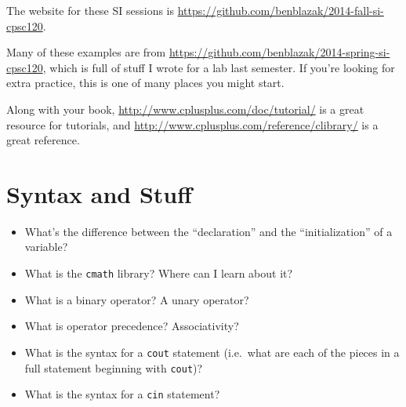 \documentclass[12pt,letterpaper]{article}
\begin{document}
\thispagestyle{firstpage}

The website for these SI sessions is
\url{https://github.com/benblazak/2014-fall-si-cpsc120}.

Many of these examples are from
\url{https://github.com/benblazak/2014-spring-si-cpsc120}, which is full of
stuff I wrote for a lab last semester.  If you're looking for extra practice,
this is one of many places you might start.

Along with your book, \url{http://www.cplusplus.com/doc/tutorial/} is a great
resource for tutorials, and \url{http://www.cplusplus.com/reference/clibrary/}
is a great reference.


\filbreak
\section*{Syntax and Stuff}
\begin{itemize}[itemsep=10ex]

  \item What's the difference between the ``declaration'' and the
    ``initialization'' of a variable?

  \item What is the \texttt{cmath} library?  Where can I learn about
    it?

  \item What is a binary operator?  A unary operator?

  \item What is operator precedence?  Associativity?

  \item What is the syntax for a \texttt{cout} statement (i.e.~what
    are each of the pieces in a full statement beginning with
    \texttt{cout})?

  \item What is the syntax for a \texttt{cin} statement?

\end{itemize}


\filbreak
\end{document}
